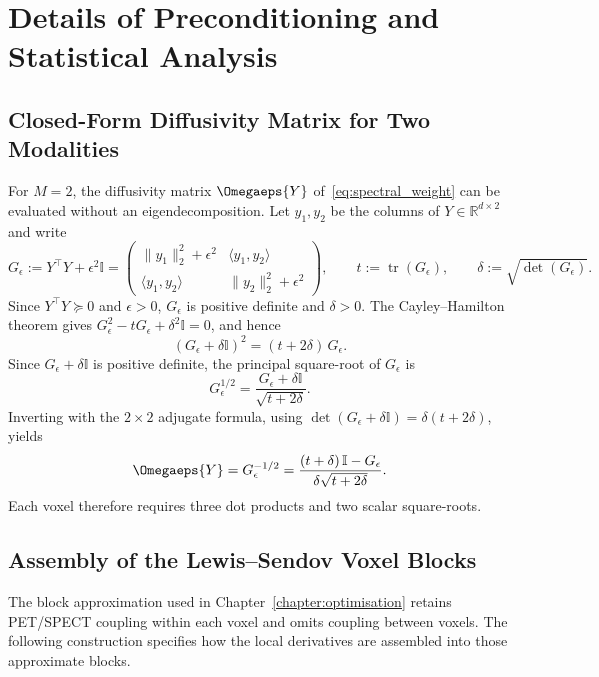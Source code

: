 \chapter{Details of Preconditioning and Statistical Analysis}
\label{app:reconstruction_details}

\section{Closed-Form Diffusivity Matrix for Two Modalities}
\label{app:inv_sqrt_2x2}

For $M=2$, the diffusivity matrix $\Omegaeps{Y}$ of~\eqref{eq:spectral_weight} can be evaluated without an eigendecomposition. Let $y_1,y_2$ be the columns of $Y\in\mathbb{R}^{d\times2}$ and write
\begin{equation}
    G_\epsilon:=Y^\top Y+\epsilon^2\mathbb{I}
    =
    \begin{pmatrix}
    \|y_1\|_2^2+\epsilon^2 & \langle y_1,y_2\rangle\\
    \langle y_1,y_2\rangle & \|y_2\|_2^2+\epsilon^2
    \end{pmatrix},
    \qquad
    t:=\operatorname{tr}(G_\epsilon),
    \qquad
    \delta:=\sqrt{\det(G_\epsilon)}.
\end{equation}
Since $Y^\top Y\succeq0$ and $\epsilon>0$, $G_\epsilon$ is positive definite and $\delta>0$. The Cayley--Hamilton theorem gives $G_\epsilon^2-tG_\epsilon+\delta^2\mathbb{I}=0$, and hence
\[
(G_\epsilon+\delta\mathbb{I})^2=(t+2\delta)\,G_\epsilon.
\]
Since $G_\epsilon+\delta\mathbb{I}$ is positive definite, the principal square-root of $G_\epsilon$ is
\[
G_\epsilon^{1/2}=\frac{G_\epsilon+\delta\mathbb{I}}{\sqrt{t+2\delta}}.
\]
Inverting with the $2\times2$ adjugate formula, using $\det(G_\epsilon+\delta\mathbb{I})=\delta(t+2\delta)$, yields
\begin{equation}
    \Omegaeps{Y}
    =G_\epsilon^{-1/2}
    =\frac{(t+\delta)\,\mathbb{I}-G_\epsilon}{\delta\sqrt{t+2\delta}}.
    \label{eq:inv_sqrt_2x2}
\end{equation}
Each voxel therefore requires three dot products and two scalar square-roots.

\section{Assembly of the Lewis--Sendov Voxel Blocks}
\label{app:ls_block_assembly}

The block approximation used in Chapter~\ref{chapter:optimisation} retains PET/SPECT coupling within each voxel and omits coupling between voxels. The following construction specifies how the local derivatives are assembled into those approximate blocks.

